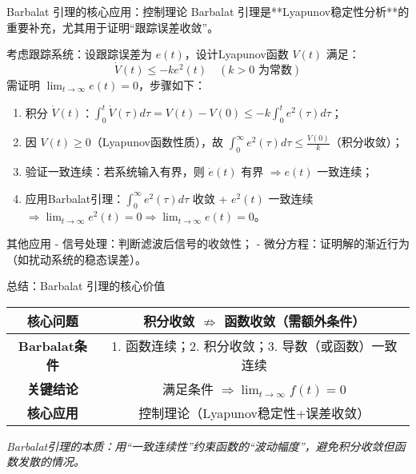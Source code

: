 \begin{frame}{Barbalat 引理的核心应用：控制理论}
  Barbalat 引理是**Lyapunov稳定性分析**的重要补充，尤其用于证明“跟踪误差收敛”。

  \vspace{0.5cm}
  \begin{example}[自适应控制中的误差收敛]
    考虑跟踪系统：设跟踪误差为 $e(t)$，设计Lyapunov函数 $V(t)$ 满足：
    \[ \dot{V}(t) \leq -k e^2(t) \quad (k > 0 \text{ 为常数}) \]
    需证明 $\lim_{t \to \infty} e(t) = 0$，步骤如下：
    \begin{enumerate}
      \item 积分 $\dot{V}(t)$：$\int_0^t \dot{V}(\tau)d\tau = V(t) - V(0) \leq -k \int_0^t e^2(\tau)d\tau$；
      \item 因 $V(t) \geq 0$（Lyapunov函数性质），故 $\int_0^\infty e^2(\tau)d\tau \leq \frac{V(0)}{k}$（积分收敛）；
      \item 验证一致连续：若系统输入有界，则 $\dot{e}(t)$ 有界 $\Rightarrow e(t)$ 一致连续；
      \item 应用Barbalat引理：$\int_0^\infty e^2(\tau)d\tau$ 收敛 + $e^2(t)$ 一致连续 $\Rightarrow \lim_{t \to \infty} e^2(t) = 0 \Rightarrow \lim_{t \to \infty} e(t) = 0$。
    \end{enumerate}
  \end{example}

  \vspace{0.3cm}
  \begin{block}{其他应用}
    - 信号处理：判断滤波后信号的收敛性；
    - 微分方程：证明解的渐近行为（如扰动系统的稳态误差）。
  \end{block}
\end{frame}

\begin{frame}{总结：Barbalat 引理的核心价值}
  \begin{center}
    \begin{tabular}{|c|c|}
      \hline
      \textbf{核心问题} & 积分收敛 $\nRightarrow$ 函数收敛（需额外条件） \\
      \hline
      \textbf{Barbalat条件} & 1. 函数连续；2. 积分收敛；3. 导数（或函数）一致连续 \\
      \hline
      \textbf{关键结论} & 满足条件 $\Rightarrow \lim_{t \to \infty} f(t) = 0$ \\
      \hline
      \textbf{核心应用} & 控制理论（Lyapunov稳定性+误差收敛） \\
      \hline
    \end{tabular}
  \end{center}

  \vspace{1cm}
  \centering
  \textit{Barbalat引理的本质：用“一致连续性”约束函数的“波动幅度”，避免积分收敛但函数发散的情况。}
\end{frame}

